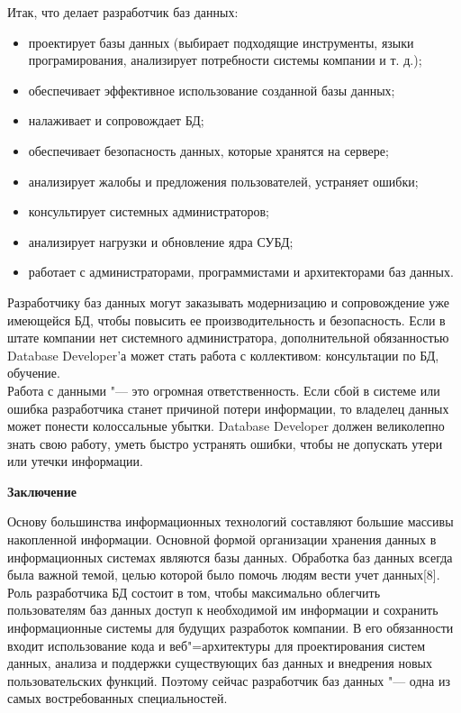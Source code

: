 \begin{flushleft}
    Итак, что делает разработчик баз данных:
    \begin{itemize}
        \item проектирует базы данных 
        (выбирает подходящие инструменты, языки програмирования, анализирует потребности системы компании и т. д.);
        \item обеспечивает эффективное использование созданной базы данных;
        \item налаживает и сопровождает БД;
        \item обеспечивает безопасность данных, которые хранятся на сервере;
        \item анализирует жалобы и предложения пользователей, устраняет ошибки;
        \item консультирует системных администраторов;
        \item анализирует нагрузки и обновление ядра СУБД;
        \item работает с администраторами, программистами и архитекторами баз данных.
    \end{itemize}
Разработчику баз данных могут заказывать модернизацию и сопровождение 
уже имеющейся БД, чтобы повысить ее производительность и безопасность. 
Если в штате компании нет системного администратора, дополнительной 
обязанностью Database Developer’а может стать работа с коллективом: 
консультации по БД, обучение. \\

Работа с данными "--- это огромная ответственность. Если сбой в системе или ошибка 
разработчика станет причиной потери информации, то владелец данных может понести 
колоссальные убытки. Database Developer должен великолепно знать свою работу, уметь 
быстро устранять ошибки, чтобы не допускать утери или утечки информации.

\newpage
    \begin{center}
        \textbf{Заключение}
    \end{center}
    \vspace*{14pt}

    Основу большинства   информационных   технологий составляют   
    большие массивы   накопленной   информации.   Основной   формой   организации   
    хранения данных   в   информационных   системах   являются   базы   данных.
    Обработка баз данных всегда была важной темой, целью которой было помочь людям
    вести учет данных[8].\\
    Роль разработчика БД состоит в том, чтобы максимально 
    облегчить пользователям баз данных доступ к необходимой им информации и 
    сохранить информационные системы для будущих разработок компании.
    В его обязанности входит использование кода и веб"=архитектуры для проектирования 
    систем данных, анализа и поддержки существующих баз данных и внедрения новых 
    пользовательских функций.
    Поэтому сейчас разработчик баз данных "--- одна из самых востребованных специальностей.


\end{flushleft}
